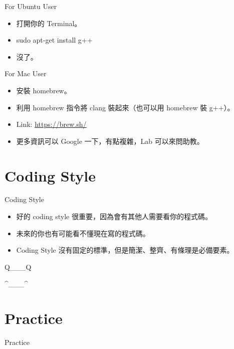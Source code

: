 \documentclass[t]{beamer}
\begin{document}
\begin{frame}{For Ubuntu User}
  \begin{itemize}
    \item 打開你的 Terminal。
    \item sudo apt-get install g++
    \item 沒了。
  \end{itemize}
\end{frame}

\begin{frame}{For Mac User}
  \begin{itemize}
    \item 安裝 homebrew。
    \item 利用 homebrew 指令將 clang 裝起來（也可以用 homebrew 裝 g++）。
    \item Link: \href{https://brew.sh/}{\underline{https://brew.sh/}}
    \item 更多資訊可以 Google 一下，有點複雜，Lab 可以來問助教。
  \end{itemize}
\end{frame}

\section{Coding Style}
\begin{frame}{Coding Style}
  \begin{itemize}
    \item 好的 coding style 很重要，因為會有其他人需要看你的程式碼。
    \item 未來的你也有可能看不懂現在寫的程式碼。
    \item Coding Style 沒有固定的標準，但是簡潔、整齊、有條理是必備要素。
  \end{itemize}
\end{frame}

\begin{frame}{Q\_\_\_Q}

\end{frame}

\begin{frame}{\textasciicircum\_\_\_\textasciicircum}

\end{frame}

\section{Practice}
\begin{frame}{Practice}
\end{frame}
\end{document}
